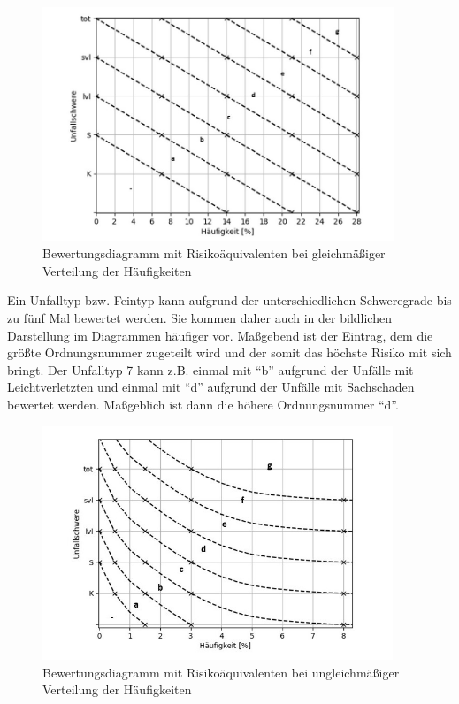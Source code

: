 \begin{savenotes}
	\begin{figure}[H]
		\centering
		\includegraphics[width=10.5cm,height=7cm]{figures/Bewertungsdiagramm}
		\caption[Bewertungsdiagramm mit Risikoäquivalenten bei gleichmäßiger Verteilung der Häufigkeiten]{Bewertungsdiagramm mit Risikoäquivalenten bei gleichmäßiger Verteilung der Häufigkeiten}\label{fig:Bewertungsdiagramm}
	\end{figure}
\end{savenotes}

Ein Unfalltyp bzw. Feintyp kann aufgrund der unterschiedlichen Schweregrade bis zu fünf Mal bewertet werden. Sie kommen daher auch in der bildlichen Darstellung im Diagrammen häufiger vor. Maßgebend ist der Eintrag, dem die größte Ordnungsnummer zugeteilt wird und der somit das höchste Risiko mit sich bringt. Der Unfalltyp 7 kann z.B. einmal mit \enquote{b} aufgrund der Unfälle mit Leichtverletzten und einmal mit \enquote{d} aufgrund der Unfälle mit Sachschaden bewertet werden. Maßgeblich ist dann die höhere Ordnungsnummer \enquote{d}.

\begin{savenotes}
	\begin{figure}[H]
		\centering
		\includegraphics[width=10.5cm,height=7cm]{figures/Bewertungsdiagramm(2)}
		\caption[Bewertungsdiagramm mit Risikoäquivalenten bei ungleichmäßiger Verteilung der Häufigkeiten]{Bewertungsdiagramm mit Risikoäquivalenten bei ungleichmäßiger Verteilung der Häufigkeiten}\label{fig:Bewertungsdiagramm(2)}
	\end{figure}
\end{savenotes}

